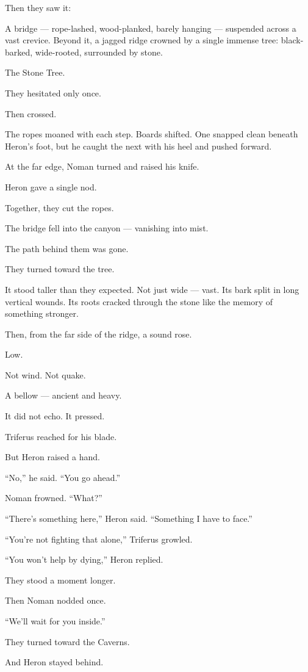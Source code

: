 \documentclass[9pt]{article}
\begin{document}
Then they saw it:

A bridge — rope-lashed, wood-planked, barely hanging — suspended across a vast crevice. Beyond it, a jagged ridge crowned by a single immense tree: black-barked, wide-rooted, surrounded by stone.

The Stone Tree.

They hesitated only once.

Then crossed.

The ropes moaned with each step. Boards shifted. One snapped clean beneath Heron’s foot, but he caught the next with his heel and pushed forward.

At the far edge, Noman turned and raised his knife.

Heron gave a single nod.

Together, they cut the ropes.

The bridge fell into the canyon — vanishing into mist.

The path behind them was gone.

\bigskip

They turned toward the tree.

It stood taller than they expected. Not just wide — vast. Its bark split in long vertical wounds. Its roots cracked through the stone like the memory of something stronger.

Then, from the far side of the ridge, a sound rose.

Low.

Not wind. Not quake.

A bellow — ancient and heavy.

It did not echo. It pressed.

Triferus reached for his blade.

But Heron raised a hand.

“No,” he said. “You go ahead.”

Noman frowned. “What?”

“There’s something here,” Heron said. “Something I have to face.”

“You’re not fighting that alone,” Triferus growled.

“You won’t help by dying,” Heron replied.

They stood a moment longer.

Then Noman nodded once.

“We’ll wait for you inside.”

They turned toward the Caverns.

And Heron stayed behind.
\end{document}
